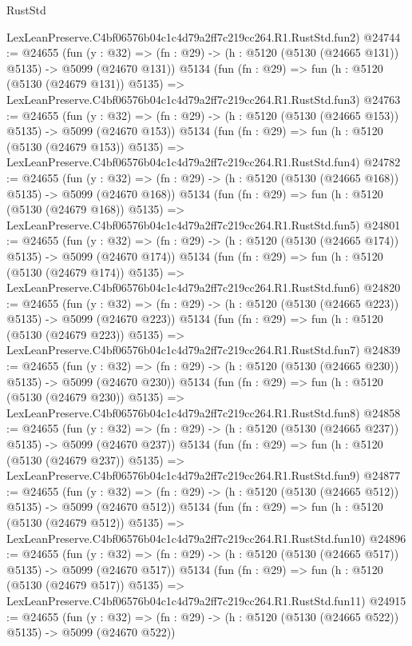 \begin{lexlean}{RustStd}
\begin{coremodule}
    LexLeanPreserve.C4bf06576b04c1c4d79a2ff7c219cc264.R1.RustStd.fun2)
@24744 := @24655
    (fun (y : @32) => (fn : @29) -> (h : @5120 (@5130 (@24665 @131)) @5135) -> @5099 (@24670 @131))
    @5134
    (fun (fn : @29) =>
    fun (h : @5120 (@5130 (@24679 @131)) @5135) =>
    LexLeanPreserve.C4bf06576b04c1c4d79a2ff7c219cc264.R1.RustStd.fun3)
@24763 := @24655
    (fun (y : @32) => (fn : @29) -> (h : @5120 (@5130 (@24665 @153)) @5135) -> @5099 (@24670 @153))
    @5134
    (fun (fn : @29) =>
    fun (h : @5120 (@5130 (@24679 @153)) @5135) =>
    LexLeanPreserve.C4bf06576b04c1c4d79a2ff7c219cc264.R1.RustStd.fun4)
@24782 := @24655
    (fun (y : @32) => (fn : @29) -> (h : @5120 (@5130 (@24665 @168)) @5135) -> @5099 (@24670 @168))
    @5134
    (fun (fn : @29) =>
    fun (h : @5120 (@5130 (@24679 @168)) @5135) =>
    LexLeanPreserve.C4bf06576b04c1c4d79a2ff7c219cc264.R1.RustStd.fun5)
@24801 := @24655
    (fun (y : @32) => (fn : @29) -> (h : @5120 (@5130 (@24665 @174)) @5135) -> @5099 (@24670 @174))
    @5134
    (fun (fn : @29) =>
    fun (h : @5120 (@5130 (@24679 @174)) @5135) =>
    LexLeanPreserve.C4bf06576b04c1c4d79a2ff7c219cc264.R1.RustStd.fun6)
@24820 := @24655
    (fun (y : @32) => (fn : @29) -> (h : @5120 (@5130 (@24665 @223)) @5135) -> @5099 (@24670 @223))
    @5134
    (fun (fn : @29) =>
    fun (h : @5120 (@5130 (@24679 @223)) @5135) =>
    LexLeanPreserve.C4bf06576b04c1c4d79a2ff7c219cc264.R1.RustStd.fun7)
@24839 := @24655
    (fun (y : @32) => (fn : @29) -> (h : @5120 (@5130 (@24665 @230)) @5135) -> @5099 (@24670 @230))
    @5134
    (fun (fn : @29) =>
    fun (h : @5120 (@5130 (@24679 @230)) @5135) =>
    LexLeanPreserve.C4bf06576b04c1c4d79a2ff7c219cc264.R1.RustStd.fun8)
@24858 := @24655
    (fun (y : @32) => (fn : @29) -> (h : @5120 (@5130 (@24665 @237)) @5135) -> @5099 (@24670 @237))
    @5134
    (fun (fn : @29) =>
    fun (h : @5120 (@5130 (@24679 @237)) @5135) =>
    LexLeanPreserve.C4bf06576b04c1c4d79a2ff7c219cc264.R1.RustStd.fun9)
@24877 := @24655
    (fun (y : @32) => (fn : @29) -> (h : @5120 (@5130 (@24665 @512)) @5135) -> @5099 (@24670 @512))
    @5134
    (fun (fn : @29) =>
    fun (h : @5120 (@5130 (@24679 @512)) @5135) =>
    LexLeanPreserve.C4bf06576b04c1c4d79a2ff7c219cc264.R1.RustStd.fun10)
@24896 := @24655
    (fun (y : @32) => (fn : @29) -> (h : @5120 (@5130 (@24665 @517)) @5135) -> @5099 (@24670 @517))
    @5134
    (fun (fn : @29) =>
    fun (h : @5120 (@5130 (@24679 @517)) @5135) =>
    LexLeanPreserve.C4bf06576b04c1c4d79a2ff7c219cc264.R1.RustStd.fun11)
@24915 := @24655
    (fun (y : @32) => (fn : @29) -> (h : @5120 (@5130 (@24665 @522)) @5135) -> @5099 (@24670 @522))

\end{coremodule}
\end{lexlean}
